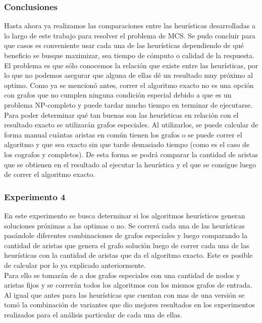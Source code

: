     
\subsubsection*{Conclusiones}\;


Hasta ahora ya realizamos las comparaciones entre las heurísticas desarrolladas a lo largo de este trabajo para resolver el problema de MCS. Se pudo concluir para que casos es conveniente usar cada una de las heurísticas dependiendo de qué beneficio se busque maximizar, sea tiempo de cómputo o calidad de la respuesta. \\
El problema es que sólo conocemos la relación que existe entre las heurísticas, por lo que no podemos asegurar que alguna de ellas dé un resultado muy próximo al optimo. Como ya se mencionó antes, correr el algoritmo exacto no es una opción con grafos que no cumplen ninguna condición especial debido a que es un problema NP-completo y puede tardar mucho tiempo en terminar de ejecutarse.\\
Para poder determinar qué tan buenas son las heurísticas en relación con el resultado exacto se utilizarán grafos especiales. Al utilizarlos, se puede calcular de forma manual cuántas aristas en común tienen los grafos o se puede correr el algoritmo y que sea exacto sin que tarde demasiado tiempo (como es el caso de los cografos y completos). De esta forma se podrá comparar la cantidad de aristas que se obtienen en el resultado al ejecutar la heurística y el que se consigue luego de correr el algoritmo exacto.


\subsubsection*{Experimento 4}\;
En este experimento se busca determinar si los algoritmos heurísticos generan soluciones próximas a las optimas o no. Se correrá cada una de las heurísticas pasándole diferentes combinaciones de grafos especiales y luego comparando la cantidad de aristas que genera el grafo solución luego de correr cada una de las heurísticas con la cantidad de aristas que da el algoritmo exacto. Este es posible de calcular por lo ya explicado anteriormente.\\
Para ello se tomarán de a dos grafos especiales con una cantidad de nodos y aristas fijos y se correrán todos los algoritmos con los mismos grafos de entrada.\\
Al igual que antes para las heurísticas que cuentan con mas de una versión se tomó la combinación de variantes que dio mejores resultados en los experimentos realizados para el análisis particular de cada una de ellas.\\

